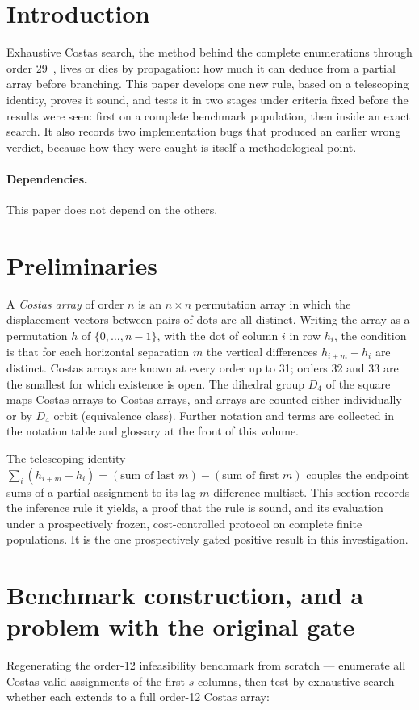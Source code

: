 \documentclass[11pt,a4paper,oneside]{report}
\theoremstyle{definition}
\begin{document}
\section{Introduction}\label{p5-sec:paperintro}
Exhaustive Costas search, the method behind the complete enumerations through order 29~\cite{p5-drakakis27,p5-drakakis28,p5-drakakis29}, lives or dies by propagation: how much it can deduce from a partial
array before branching. This paper develops one new rule, based on a telescoping identity, proves it
sound, and tests it in two stages under criteria fixed before the results were seen: first on a
complete benchmark population, then inside an exact search. It also records two implementation bugs
that produced an earlier wrong verdict, because how they were caught is itself a methodological
point.

\paragraph{Dependencies.} This paper does not depend on the others.

\section{Preliminaries}\label{p5-sec:notation}
A \emph{Costas array} of order $n$ is an $n\times n$ permutation array in which the displacement
vectors between pairs of dots are all distinct. Writing the array as a permutation $h$ of
$\{0,\dots,n-1\}$, with the dot of column $i$ in row $h_i$, the condition is that for each
horizontal separation $m$ the vertical differences $h_{i+m}-h_i$ are distinct. Costas arrays are
known at every order up to 31; orders 32 and 33 are the smallest for which existence is open. The
dihedral group $D_4$ of the square maps Costas arrays to Costas arrays, and arrays are counted
either individually or by $D_4$ orbit (equivalence class). Further notation and terms are collected
in the notation table and glossary at the front of this volume.


The telescoping identity $\sum_i(h_{i+m}-h_i)=(\text{sum of last }m)-(\text{sum
of first }m)$ couples the endpoint sums of a partial assignment to its
lag-$m$ difference multiset. This section records the inference rule it yields,
a proof that the rule is sound, and its evaluation under a prospectively frozen,
cost-controlled protocol on complete finite populations. It is the one
prospectively gated positive result in this investigation.

\section{Benchmark construction, and a problem with the original gate}
Regenerating the order-12 infeasibility benchmark from scratch --- enumerate all
Costas-valid assignments of the first $s$ columns, then test by exhaustive search
whether each extends to a full order-12 Costas array:
\end{document}
